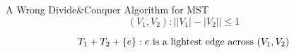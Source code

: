 % 

% 
% 

\begin{frame}{}
  \begin{exampleblock}{A Wrong Divide\&Conquer Algorithm for MST}
    \[
      (V_{1}, V_{2}): \Big\rvert |V_{1}| - |V_{2}| \Big\rvert \le 1
    \]
    
    \[
      T_{1} + T_{2} + \left\{e\right\}: e \text{ is a lightest edge across } (V_{1}, V_{2})
    \]
  \end{exampleblock}

  \pause
  \vspace{0.30cm}
\end{frame}
